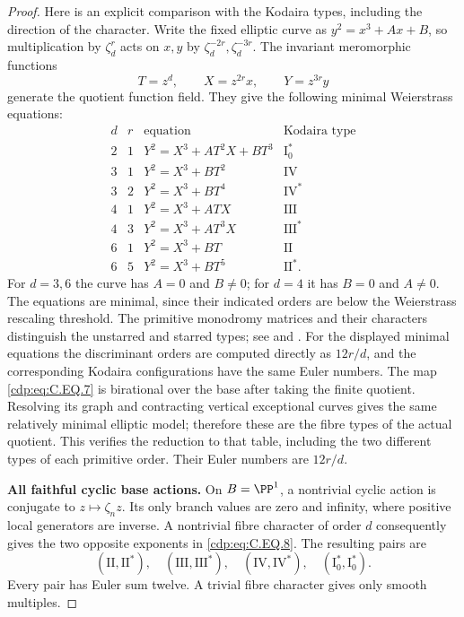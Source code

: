 \begin{proof}
Here is an explicit comparison with the Kodaira
types, including the direction of the character.
Write the fixed elliptic curve as
$y^2=x^3+Ax+B$, so multiplication by $\zeta_d^r$
acts on $x,y$ by $\zeta_d^{-2r},\zeta_d^{-3r}$.
The invariant meromorphic functions
\[
          T=z^d,\qquad X=z^{2r}x,\qquad Y=z^{3r}y
                                                               \tag{C.EQ.7}\label{cdp:eq:C.EQ.7}
\]
generate the quotient function field. They give
the following minimal Weierstrass equations:
\[
\begin{array}{c|c|c|c}
d&r&\text{equation}&\text{Kodaira type}\\ \hline
2&1&Y^2=X^3+AT^2X+BT^3&\mathrm I_0^*\\
3&1&Y^2=X^3+BT^2&\mathrm{IV}\\
3&2&Y^2=X^3+BT^4&\mathrm{IV}^*\\
4&1&Y^2=X^3+ATX&\mathrm{III}\\
4&3&Y^2=X^3+AT^3X&\mathrm{III}^*\\
6&1&Y^2=X^3+BT&\mathrm{II}\\
6&5&Y^2=X^3+BT^5&\mathrm{II}^* .
\end{array}                                                   \tag{C.EQ.8}\label{cdp:eq:C.EQ.8}
\]
For $d=3,6$ the curve has $A=0$ and $B\ne0$;
for $d=4$ it has $B=0$ and $A\ne0$.
The equations are minimal, since their indicated
orders are below the Weierstrass rescaling threshold.
The primitive monodromy matrices and their characters distinguish the
unstarred and starred types; see \citet[Section~2.3, pp.~5--6]{UlmerUrzua2021}
and \citet[Theorem~6.2 and Section~8(iv)]{Kodaira1963II}.
For the displayed minimal equations the discriminant orders are computed
directly as $12r/d$, and the corresponding Kodaira configurations have
the same Euler numbers.
The map \eqref{cdp:eq:C.EQ.7} is birational over the base
after taking the finite quotient. Resolving its
graph and contracting vertical exceptional curves
gives the same relatively minimal elliptic model;
therefore these are the fibre types of the actual
quotient. This verifies the reduction to that table,
including the two different types of each primitive
order. Their Euler numbers are $12r/d$.

\par\medskip\noindent\textbf{All faithful cyclic base actions.}
On $B=\PP^1$, a nontrivial cyclic action is conjugate
to $z\mapsto\zeta_nz$. Its only branch values are
zero and infinity, where positive local generators
are inverse. A nontrivial fibre character of order
$d$ consequently gives the two opposite exponents
in \eqref{cdp:eq:C.EQ.8}. The resulting pairs are
\[
 (\mathrm{II},\mathrm{II}^*),\quad
 (\mathrm{III},\mathrm{III}^*),\quad
 (\mathrm{IV},\mathrm{IV}^*),\quad
 (\mathrm I_0^*,\mathrm I_0^*).                         \tag{C.EQ.9}\label{cdp:eq:C.EQ.9}
\]
Every pair has Euler sum twelve. A trivial fibre
character gives only smooth multiples.


\end{proof}

